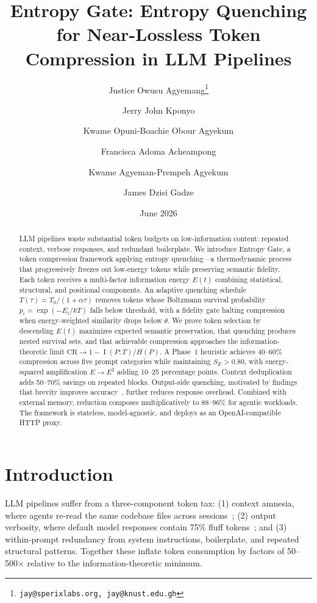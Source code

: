 \documentclass[11pt]{article}
\title{Entropy Gate: Entropy Quenching for Near-Lossless Token Compression in LLM Pipelines}
\author[1,2]{Justice Owusu Agyemang\thanks{\texttt{jay@sperixlabs.org, jay@knust.edu.gh}}}
\author[2]{Jerry John Kponyo}
\author[1]{Kwame Opuni-Boachie Obour Agyekum}
\author[1]{Francisca Adoma Acheampong}
\author[1]{Kwame Agyeman-Prempeh Agyekum}
\author[1]{James Dzisi Gadze}
\affil[1]{\small VIA Cybersecurity Lab, Kwame Nkrumah University of Science and Technology, Kumasi, Ghana}
\affil[2]{\small Quantum and Assistive Technologies Lab, Kwame Nkrumah University of Science and Technology, Kumasi, Ghana}
\date{June 2026}
\theoremstyle{remark}
\DeclareMathOperator{\MI}{I}
\begin{document}
\maketitle

\begin{abstract}
LLM pipelines waste substantial token budgets on low-information content:
repeated context, verbose responses, and redundant boilerplate. We introduce
Entropy Gate, a token compression framework applying entropy quenching---a
thermodynamic process that progressively freezes out low-energy tokens while
preserving semantic fidelity. Each token receives a multi-factor information
energy $E(t)$ combining statistical, structural, and positional components.
An adaptive quenching schedule $T(\tau) = T_0 / (1 + \alpha \tau)$ removes
tokens whose Boltzmann survival probability $p_i = \exp(-E_i / kT)$ falls
below threshold, with a fidelity gate halting compression when energy-weighted
similarity drops below $\theta$. We prove token selection by descending
$E(t)$ maximizes expected semantic preservation, that quenching produces
nested survival sets, and that achievable compression approaches the
information-theoretic limit $\text{CR} \to 1 - \MI(P; T)/H(P)$. A
Phase~1 heuristic achieves 40--60\% compression across five prompt
categories while maintaining $S_E > 0.80$, with energy-squared amplification
$E \to E^2$ adding 10--25 percentage points. Context deduplication adds
50--70\% savings on repeated blocks. Output-side quenching, motivated by findings that
brevity improves accuracy~\cite{caveman2026}, further reduces response overhead. Combined with external memory,
reduction composes multiplicatively to 88--96\% for agentic workloads.
The framework is stateless, model-agnostic, and deploys as an
OpenAI-compatible HTTP proxy.
\end{abstract}

\section{Introduction}

LLM pipelines suffer from a three-component token tax: (1) context amnesia,
where agents re-read the same codebase files across sessions~\cite{rosati2026};
(2) output verbosity, where default model responses contain 75\% fluff
tokens~\cite{caveman2026}; and (3) within-prompt redundancy from system
instructions, boilerplate, and repeated structural patterns. Together these
inflate token consumption by factors of 50--500$\times$ relative to the
information-theoretic minimum.
\end{document}
